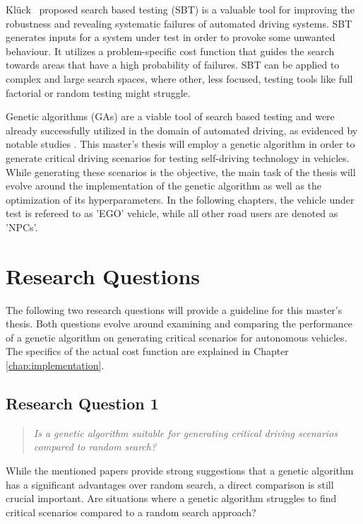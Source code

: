 Klück~\cite{kluck_search-based_2022} proposed search based testing (SBT) is a valuable tool for improving the robustness and revealing systematic failures of automated driving systems. SBT generates inputs for a system under test in order to provoke some unwanted behaviour. It utilizes a problem-specific cost function that guides the search towards areas that have a high probability of failures. SBT can be applied to complex and large search spaces, where other, less focused, testing tools like full factorial or random testing might struggle.

Genetic algorithms (GAs) are a viable tool of search based testing and were already successfully utilized in the domain of automated driving, as evidenced by notable studies \cite{klampfl_using_nodate, felbinger_comparing_2019, kaufmann_critical_2021, almanee_scenorita_2021}. This master's thesis will employ a genetic algorithm in order to generate critical driving scenarios for testing self-driving technology in vehicles. While generating these scenarios is the objective, the main task of the thesis will evolve around the implementation of the genetic algorithm as well as the optimization of its hyperparameters. In the following chapters, the vehicle under test is refereed to as 'EGO' vehicle, while all other road users are denoted as 'NPCs'.

\section{Research Questions}
The following two research questions will provide a guideline for this master's thesis. Both questions evolve around examining and comparing the performance of a genetic algorithm on generating critical scenarios for autonomous vehicles. The specifics of the actual cost function are explained in Chapter \ref{chap:implementation}.

\subsection{Research Question 1}
\begin{quote}
	\begin{em}
		\textit{Is a genetic algorithm suitable for generating critical driving scenarios compared to random search?}
	\end{em}
\end{quote}

While the mentioned papers provide strong suggestions that a genetic algorithm has a significant advantages over random search, a direct comparison is still crucial important. Are situations where a genetic algorithm struggles to find critical scenarios compared to a random search approach?

